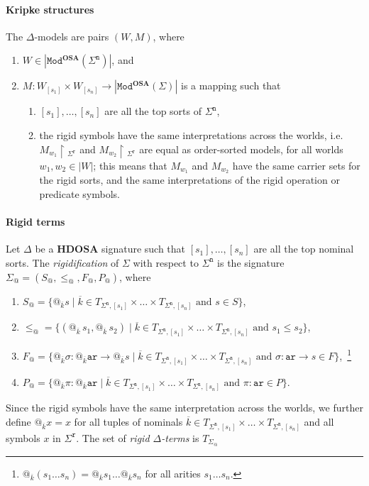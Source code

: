 \documentclass{article}
\makeatletter
\newcommand{\OSA}{{\mathbf{OSA}}}
\newcommand{\HDOSA}{{\mathbf{HDOSA}}}
\newcommand{\Mod}{\mathtt{Mod}}
\newcommand{\red}{\!\upharpoonright\!}
\newcommand{\ari}{\mathtt{ar}}
\newcommand{\rigid}{\mathtt{r}}
\newcommand{\nom}{\mathtt{n}}
\newcommand{\ok}{{\overline k}}
\newcommand{\at}[1]{@_{#1}\,}
\makeatother
\begin{document}
\paragraph{Kripke structures}
The $\Delta$-models are pairs $(W,M)$, where
\begin{enumerate}
\item $W\in|\Mod^\OSA(\Sigma^\nom)|$, and 
\item $M\colon W_{[s_1]}\times W_{[s_n]}\to|\Mod^\OSA(\Sigma)|$ is a mapping such that 
\begin{enumerate}
 \item $[s_1],\dots,[s_n]$ are all the top sorts of $\Sigma^\nom$,
 \item the rigid symbols have the same interpretations across the worlds, i.e. ${M_{w_1}\red_{\Sigma^\rigid}}$ and ${M_{w_2}\red_{\Sigma^\rigid}}$ are equal as order-sorted models, for all worlds $w_1,w_2\in|W|$; 
 this means that \(M_{w_{1}}\) and \(M_{w_{2}}\) have the same carrier sets for the rigid sorts, and the same interpretations of the rigid operation or predicate symbols.
 \end{enumerate}
\end{enumerate}

\paragraph{Rigid terms} 
 Let $\Delta$ be a $\HDOSA$ signature such that $[s_1],\dots,[s_n]$ are all the top nominal sorts.
 The \emph{rigidification} of $\Sigma$ with respect to $\Sigma^\nom$ is the signature $\Sigma_@=(S_@,\leq_@,F_@,P_@)$, where 
 \begin{enumerate}
 \item $S_@=\{@_{\overline{k}} s \mid \overline{k}\in T_{\Sigma^\nom,[s_1]}\times\dots\times T_{\Sigma^\nom,[s_n]} \mbox{ and } s\in S\}$,
 
 \item $\leq_@=\{ (\at{\overline{k}}s_1,\at{\overline{k}}s_2 ) \mid \overline{k}\in T_{\Sigma^\nom,[s_1]}\times\dots\times T_{\Sigma^\nom,[s_n]} \mbox{ and } s_1\leq s_2  \}$,
 
 \item $F_@=\{@_{\overline{k}}\sigma\colon @_{\overline{k}}\ari \to @_{\overline{k}} s \mid \ok\in T_{\Sigma^\nom,[s_1]}\times\dots\times T_{\Sigma^\nom,[s_n]} \mbox{ and } \sigma\colon \ari\to s \in F \}$,~\footnote{$@_\ok (s_1\ldots s_n)=@_\ok s_1\ldots @_\ok s_n$ for all arities $s_1\ldots s_n$.}
 
 \item $P_@=\{@_\ok \pi\colon @_\ok \ari \mid \ok\in T_{\Sigma^\nom,[s_1]}\times\dots\times T_{\Sigma^\nom,[s_n]} \mbox{ and } \pi\colon\ari\in P\}$.
 \end{enumerate}
 Since the rigid symbols have the same interpretation across the worlds, we further define $@_\ok x=x$ for all tuples of nominals $\ok\in T_{\Sigma^\nom,[s_1]}\times\dots\times T_{\Sigma^\nom,[s_n]}$ and all symbols $x$ in $\Sigma^\rigid$.
 The set of \emph{rigid $\Delta$-terms} is $T_{\Sigma_@}$
 
\end{document}
